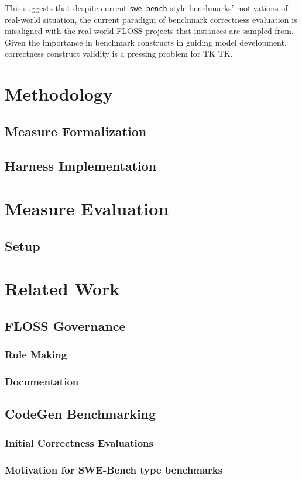 \documentclass[10pt,conference, anon]{IEEEtran}
\begin{document}
This suggests that despite current \texttt{swe-bench} style benchmarks' motivations of real-world situation, the current paradigm of benchmark correctness evaluation is misaligned with the real-world FLOSS projects that instances are sampled from. Given the importance in benchmark constructs in guiding model development, correctness construct validity is a pressing problem for TK TK.
\section{Methodology}
\subsection{Measure Formalization}
\subsection{Harness Implementation}
\section{Measure Evaluation}
\subsection{Setup}

\section{Related Work}
\subsection{FLOSS Governance}
\subsubsection{Rule Making}
\subsubsection{Documentation}
\subsection{CodeGen Benchmarking}
\subsubsection{Initial Correctness Evaluations}
\subsubsection{Motivation for SWE-Bench type benchmarks}
\end{document}
